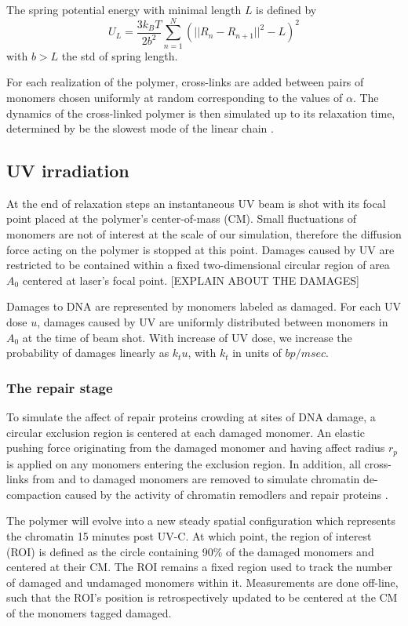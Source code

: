 \documentclass[12pt]{article}
\begin{document}
	The spring potential energy with minimal length $L$ is defined by  
	\begin{equation}
	U_L=\frac{3k_BT}{2b^2}\sum_{n=1}^N (||R_{n}-R_{n+1}||^2-L)^2
	\end{equation}
    with $b>L$ the std of spring length. 
    		
	For each realization of the polymer, cross-links are added between pairs of monomers chosen uniformly at random corresponding to the values of $\alpha$. The dynamics of the cross-linked polymer is then simulated up to its relaxation time, determined by be the slowest mode of the linear chain \cite{doi1988theory}.

	\subsection{UV irradiation}
	At the end of relaxation steps an instantaneous UV beam is shot with its focal point placed at the polymer's center-of-mass (CM). Small fluctuations of monomers are not of interest at the scale of our simulation, therefore the diffusion force acting on the polymer is stopped at this point. Damages caused by UV are restricted to be contained within a fixed two-dimensional circular region of area $A_0$ centered at laser's focal point. [EXPLAIN ABOUT THE DAMAGES]
	
	Damages to DNA are represented by monomers labeled as damaged. For each UV dose $u$, damages caused by UV are uniformly distributed between  monomers in $A_0$ at the time of beam shot. With increase of UV dose, we increase the probability of damages linearly as $k_tu$, with $k_t$ in units of $bp/msec$. 
	
	\subsubsection{The repair stage}	
	To simulate the affect of repair proteins crowding at sites of DNA damage, a circular exclusion region is centered at each damaged monomer. An elastic pushing force originating from the damaged monomer and having affect radius $r_p$ is applied on any monomers entering the exclusion region. In addition, all cross-links from and to damaged monomers are removed to simulate chromatin de-compaction caused by the activity of chromatin remodlers and repair proteins \cite{gaillard2003chromatin}. 
	
	The polymer will evolve into a new steady spatial configuration which represents the chromatin 15 minutes post UV-C. At which point, the region of interest (ROI) is defined as the circle containing 90\% of the damaged monomers and centered at their CM. The ROI remains a fixed region used to track the number of damaged and undamaged monomers within it. Measurements are done off-line, such that the ROI's position is retrospectively updated to be centered at the CM of the monomers tagged damaged.
	
\end{document}
